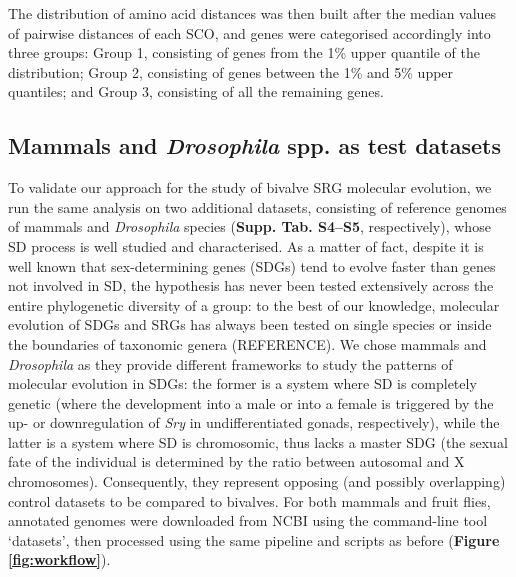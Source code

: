 \documentclass[../main.tex]{subfiles}
\begin{document}
The distribution of amino acid distances was then built after the median values of pairwise distances of each SCO, and genes were categorised accordingly into three groups: Group 1, consisting of genes from the 1\% upper quantile of the distribution; Group 2, consisting of genes between the 1\% and 5\% upper quantiles; and Group 3, consisting of all the remaining genes.

\subsection{Mammals and \textit{Drosophila} spp. as test datasets}
To validate our approach for the study of bivalve SRG molecular evolution, we run the same analysis on two additional datasets, consisting of reference genomes of mammals and \textit{Drosophila} species (\textbf{Supp. Tab. S4--S5}, respectively), whose SD process is well studied and characterised. As a matter of fact, despite it is well known that sex-determining genes (SDGs) tend to evolve faster than genes not involved in SD, the hypothesis has never been tested extensively across the entire phylogenetic diversity of a group: to the best of our knowledge, molecular evolution of SDGs and SRGs has always been tested on single species or inside the boundaries of taxonomic genera (REFERENCE). We chose mammals and \textit{Drosophila} as they provide different frameworks to study the patterns of molecular evolution in SDGs: the former is a system where SD is completely genetic (where the development into a male or into a female is triggered by the up- or downregulation of \textit{Sry} in undifferentiated gonads, respectively), while the latter is a system where SD is chromosomic, thus lacks a master SDG (the sexual fate of the individual is determined by the ratio between autosomal and X chromosomes). Consequently, they represent opposing (and possibly overlapping) control datasets to be compared to bivalves. For both mammals and fruit flies, annotated genomes were downloaded from NCBI using the command-line tool ‘datasets’, then processed using the same pipeline and scripts as before (\textbf{Figure \ref{fig:workflow}}).
\end{document}
